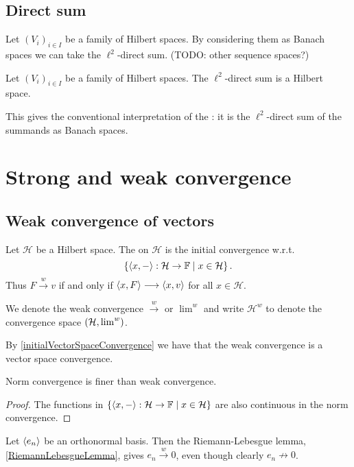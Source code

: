 \subsection{Direct sum}
Let $(V_i)_{i\in I}$ be a family of Hilbert spaces. By considering them as Banach spaces we can take the $\ell^2$-direct sum. (TODO: other sequence spaces?)
\begin{proposition}
Let $(V_i)_{i\in I}$ be a family of Hilbert spaces. The $\ell^2$-direct sum is a Hilbert space.
\end{proposition}
This gives the conventional interpretation of the : it is the $\ell^2$-direct sum of the summands as Banach spaces.

\section{Strong and weak convergence}
\subsection{Weak convergence of vectors}
\begin{definition}
Let $\mathcal{H}$ be a Hilbert space. The  on $\mathcal{H}$ is the initial convergence w.r.t.
\[ \left\{ \left\langle x,- \right\rangle: \mathcal{H}\to \mathbb{F} \;\middle|\; x\in\mathcal{H} \right\}. \]
Thus $F \overset{w}{\longrightarrow} v$ \textup{if and only if} $\left\langle x, F \right\rangle \longrightarrow \left\langle x,v \right\rangle$ for all $x\in\mathcal{H}$.

We denote the weak convergence $\overset{w}{\longrightarrow}$ or $\lim^w$ and write $\mathcal{H}^w$ to denote the convergence space $\left( \mathcal{H},\lim^w \right)$.
\end{definition}
By \ref{initialVectorSpaceConvergence} we have that the weak convergence is a vector space convergence.

\begin{lemma} \label{normConvergenceFinerThenWeakConvergence}
Norm convergence is finer than weak convergence.
\end{lemma}
\begin{proof}
The functions in $\left\{ \left\langle x,- \right\rangle: \mathcal{H}\to \mathbb{F} \;\middle|\; x\in\mathcal{H} \right\}$ are also continuous in the norm convergence.
\end{proof}

\begin{example}
Let $\left\langle e_n \right\rangle$ be an orthonormal basis. Then the Riemann-Lebesgue lemma, \ref{RiemannLebesgueLemma}, gives $e_n \overset{w}{\longrightarrow} 0$, even though clearly $e_n \not\to 0$.
\end{example}

